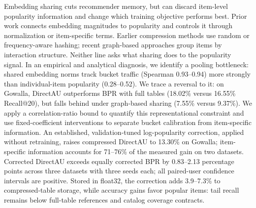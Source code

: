 Embedding sharing cuts recommender memory, but can discard item-level popularity information and change which training objective performs best. Prior work connects embedding magnitudes to popularity and controls it through normalization or item-specific terms. Earlier compression methods use random or frequency-aware hashing; recent graph-based approaches group items by interaction structure. Neither line asks what sharing does to the popularity signal. In an empirical and analytical diagnosis, we identify a pooling bottleneck: shared embedding norms track bucket traffic (Spearman 0.93–0.94) more strongly than individual-item popularity (0.28–0.52). We trace a reversal to it: on Gowalla, DirectAU outperforms BPR with full tables (18.02\% versus 16.55\% Recall@20), but falls behind under graph-based sharing (7.55\% versus 9.37\%). We apply a correlation-ratio bound to quantify this representational constraint and use fixed-coefficient interventions to separate bucket calibration from item-specific information. An established, validation-tuned log-popularity correction, applied without retraining, raises compressed DirectAU to 13.30\% on Gowalla; item-specific information accounts for 71–76\% of the measured gain on two datasets. Corrected DirectAU exceeds equally corrected BPR by 0.83–2.13 percentage points across three datasets with three seeds each; all paired-user confidence intervals are positive. Stored in float32, the correction adds 3.9–7.3\% to compressed-table storage, while accuracy gains favor popular items: tail recall remains below full-table references and catalog coverage contracts.
